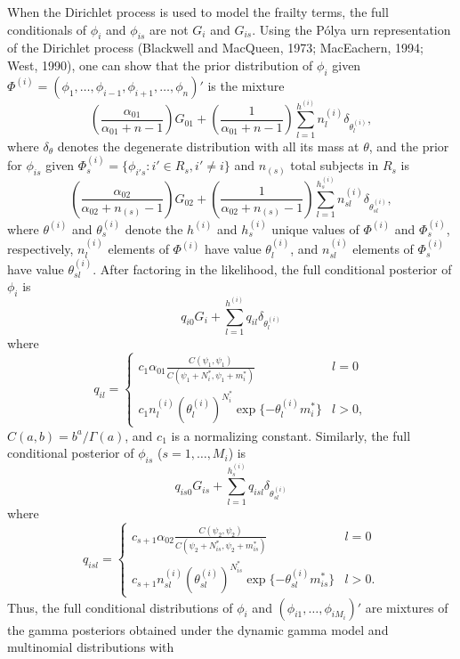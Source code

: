 \documentclass[10pt, letterpaper]{article}
\begin{document}
When the Dirichlet process is used to model the frailty terms, the full conditionals of $\phi_i$ and $\phi_{is}$ are not $G_i$ and $G_{is}$. Using the P\'{o}lya urn representation of the Dirichlet process (Blackwell and MacQueen, 1973; MacEachern, 1994; West, 1990), one can show that the prior distribution of $\phi_i$ given $\Phi^{(i)} = (\phi_1, \dots, \phi_{i-1}, \phi_{i+1}, \dots, \phi_n)'$ is the mixture
\begin{equation} \label{eq:A7}
\left( \frac{\alpha_{01}}{\alpha_{01} + n - 1} \right) G_{01} + \left( \frac{1}{\alpha_{01} + n - 1} \right) \sum_{l=1}^{h^{(i)}} n_l^{(i)} \delta_{\theta_l^{(i)}},
\tag{A-7}
\end{equation}
where $\delta_\theta$ denotes the degenerate distribution with all its mass at $\theta$, and the prior for $\phi_{is}$ given $\Phi_s^{(i)} = \{ \phi_{i's} : i' \in R_s, i' \ne i \}$ and $n_{(s)}$ total subjects in $R_s$ is
\begin{equation} \label{eq:A8}
\left( \frac{\alpha_{02}}{\alpha_{02} + n_{(s)} - 1} \right) G_{02} + \left( \frac{1}{\alpha_{02} + n_{(s)} - 1} \right) \sum_{l=1}^{h_s^{(i)}} n_{sl}^{(i)} \delta_{\theta_{sl}^{(i)}},
\tag{A-8}
\end{equation}
where $\theta^{(i)}$ and $\theta_s^{(i)}$ denote the $h^{(i)}$ and $h_s^{(i)}$ unique values of $\Phi^{(i)}$ and $\Phi_s^{(i)}$, respectively, $n_l^{(i)}$ elements of $\Phi^{(i)}$ have value $\theta_l^{(i)}$, and $n_{sl}^{(i)}$ elements of $\Phi_s^{(i)}$ have value $\theta_{sl}^{(i)}$. After factoring in the likelihood, the full conditional posterior of $\phi_i$ is
\begin{equation} \label{eq:A9}
q_{i0} G_i + \sum_{l=1}^{h^{(i)}} q_{il} \delta_{\theta_l^{(i)}}
\tag{A-9}
\end{equation}
where
\[
q_{il} = 
\begin{cases} 
c_1 \alpha_{01} \frac{C(\psi_1, \psi_1)}{C(\psi_1 + N_i^*, \psi_1 + m_i^*)} & l = 0 \\
c_1 n_l^{(i)} (\theta_l^{(i)})^{N_i^*} \exp\{-\theta_l^{(i)} m_i^*\} & l > 0, 
\end{cases}
\]
$C(a,b) = b^a / \Gamma(a)$, and $c_1$ is a normalizing constant. Similarly, the full conditional posterior of $\phi_{is}$ ($s=1, \dots, M_i$) is
\begin{equation} \label{eq:A10}
q_{is0} G_{is} + \sum_{l=1}^{h_s^{(i)}} q_{isl} \delta_{\theta_{sl}^{(i)}}
\tag{A-10}
\end{equation}
where
\[
q_{isl} = 
\begin{cases} 
c_{s+1} \alpha_{02} \frac{C(\psi_2, \psi_2)}{C(\psi_2 + N_{is}^*, \psi_2 + m_{is}^*)} & l = 0 \\
c_{s+1} n_{sl}^{(i)} (\theta_{sl}^{(i)})^{N_{is}^*} \exp\{-\theta_{sl}^{(i)} m_{is}^*\} & l > 0. 
\end{cases}
\]
Thus, the full conditional distributions of $\phi_i$ and $(\phi_{i1}, \dots, \phi_{iM_i})'$ are mixtures of the gamma posteriors obtained under the dynamic gamma model and multinomial distributions with
\end{document}
